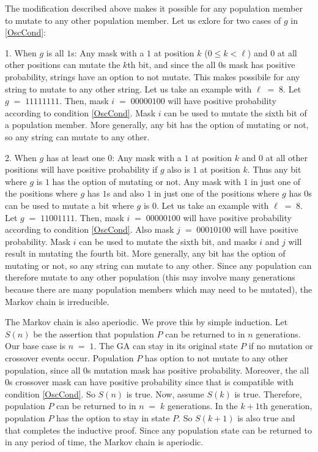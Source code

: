 The modification described above makes it possible for any population member to mutate to any other population member.
Let us exlore for two cases of $g$ in \ref{OscCond}:

1. When $g$ is all $1$s:\newline
Any mask with a $1$ at position $k$ ($0 \leq k < \ell$) and $0$ at all other positions can mutate the $k$th bit, and since the 
all $0$s mask has positive probability, strings have an option to not mutate. This makes possibile for any string to mutate to 
any other string. Let us take an example with $\ell \;=\; 8$. Let $g \;=\; 11111111$. Then, mask 
$i \;=\; 00000100$ will have positive probability according to condition \ref{OscCond}. 
Mask $i$ can be used to mutate the sixth bit of a population member. More generally, 
any bit has the option of mutating or not, so any string can mutate to any other.

2. When $g$ has at least one $0$:\newline
Any mask with a $1$ at position $k$ and $0$ at all other positions  
will have positive probability if $g$ also is $1$ at position $k$. Thus any bit where $g$ is $1$ has the option of mutating or not.  
Any mask with $1$ in just one of the positions where $g$ has $1$s and also $1$ in just one of the positions where $g$ has $0$s can be used to 
mutate a bit where $g$ is $0$. Let us take an example with $\ell \;=\; 8$. Let $g \;=\; 11001111$. Then, 
mask $i \;=\; 00000100$ will have positive probability according to condition \ref{OscCond}. Also mask 
$j \;=\; 00010100$ will have positive probability. Mask $i$ can be used to mutate the sixth bit, and masks $i$ and $j$ will result in mutating
the fourth bit. More generally, any bit has the option of mutating or not, so any string can mutate to any other. Since any population can therefore 
mutate to any other population (this may involve many generations because there are many population members which may need to be mutated), the Markov 
chain is irreducible.

The Markov chain is also aperiodic. We prove this by simple induction. 
Let $S(n)$ be the assertion that population $P$ can be returned to in $n$ generations. 
Our base case is $n \;=\; 1$. The GA can stay in its original state $P$ if no mutation or crossover events occur. 
Population $P$ has option to not mutate to any other population, since all $0$s mutation mask 
has positive probability. Moreover, the all $0$s crossover mask can have positive probability since 
that is compatible with condition \ref{OscCond}.
So $S(n)$ is true. Now, assume $S(k)$ is true. Therefore, population $P$ can be returned to in $n \;= \;k$ generations. 
In the $k+1$th generation, population $P$ has the option to stay in state $P$. 
So $S(k+1)$ is also true and that completes the inductive proof. 
Since any population state can be returned to in any period of time, the Markov chain is aperiodic. 

